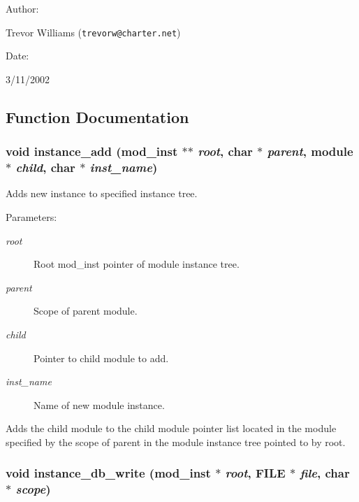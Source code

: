 \begin{Desc}
\item[Author: ]\par
Trevor Williams ({\tt trevorw@charter.net}) \end{Desc}
\begin{Desc}
\item[Date: ]\par
3/11/2002\end{Desc}


\subsection{Function Documentation}
\subsubsection{\setlength{\rightskip}{0pt plus 5cm}void instance\_\-add ({\bf mod\_\-inst} $\ast$$\ast$ {\em root}, char $\ast$ {\em parent}, {\bf module} $\ast$ {\em child}, char $\ast$ {\em inst\_\-name})}\label{instance_8h_a1}


Adds new instance to specified instance tree.

\begin{Desc}
\item[Parameters: ]\par
\begin{description}
\item[{\em 
root}]Root mod\_\-inst pointer of module instance tree. \item[{\em 
parent}]Scope of parent module. \item[{\em 
child}]Pointer to child module to add. \item[{\em 
inst\_\-name}]Name of new module instance.\end{description}
\end{Desc}
Adds the child module to the child module pointer list located in the module specified by the scope of parent in the module instance tree pointed to by root. 
\subsubsection{\setlength{\rightskip}{0pt plus 5cm}void instance\_\-db\_\-write ({\bf mod\_\-inst} $\ast$ {\em root}, FILE $\ast$ {\em file}, char $\ast$ {\em scope})}\label{instance_8h_a2}



